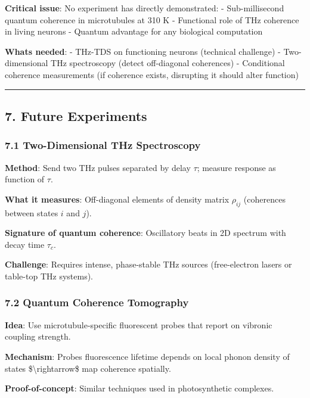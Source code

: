 \textbf{Critical issue}: No experiment has directly demonstrated: -
Sub-millisecond quantum coherence in microtubules at 310 K - Functional
role of THz coherence in living neurons - Quantum advantage for any
biological computation

\textbf{What\textquotesingle s needed}: - THz-TDS on functioning neurons
(technical challenge) - Two-dimensional THz spectroscopy (detect
off-diagonal coherences) - Conditional coherence measurements (if
coherence exists, disrupting it should alter function)

\begin{center}\rule{0.5\linewidth}{0.5pt}\end{center}

\subsection{7. Future Experiments}\label{future-experiments}

\subsubsection{7.1 Two-Dimensional THz
Spectroscopy}\label{two-dimensional-thz-spectroscopy}

\textbf{Method}: Send two THz pulses separated by delay \(\tau\);
measure response as function of \(\tau\).

\textbf{What it measures}: Off-diagonal elements of density matrix
\(\rho_{ij}\) (coherences between states \(i\) and \(j\)).

\textbf{Signature of quantum coherence}: Oscillatory beats in 2D
spectrum with decay time \(\tau_c\).

\textbf{Challenge}: Requires intense, phase-stable THz sources
(free-electron lasers or table-top THz systems).

\subsubsection{7.2 Quantum Coherence
Tomography}\label{quantum-coherence-tomography}

\textbf{Idea}: Use microtubule-specific fluorescent probes that report
on vibronic coupling strength.

\textbf{Mechanism}: Probe\textquotesingle s fluorescence lifetime
depends on local phonon density of states \$\textbackslash rightarrow\$
map coherence spatially.

\textbf{Proof-of-concept}: Similar techniques used in photosynthetic
complexes.

